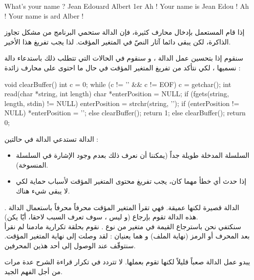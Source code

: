 \begin{Console}
  What's your name ? Jean Edouard Albert 1er
  Ah ! Your name is Jean Edou !
  Ah ! Your name is ard Alber !
\end{Console}

إذا قام المستعمل بإدخال محارف كثيرة، فإن الدالة
ستحمي البرنامج من مشكل تجاوز الذاكرة، لكن يبقى دائما آثار النصّ في المتغير المؤقت. لذا يجب تفريغ هذا الأخير.

سنقوم إذا بتحسين عمل الدالة
،
و سنقوم في الحالات التي تتطلب ذلك باستدعاء دالة نسميها
،
لكي نتأكد من تفريغ المتغير المؤقت في حال ما احتوى على محارف زائدة :

\begin{Csource}
void clearBuffer()
{
 	int c = 0;
 	while (c != '\n' && c != EOF)
 	{
     		c = getchar();
 	}
}
int read(char *string, int length)
{
 	char *enterPosition = NULL;
 	if (fgets(string, length, stdin) != NULL)
 	{
     		enterPosition = strchr(string, '\n');
     		if (enterPosition != NULL)
     		{
         			*enterPosition = '\0';
     		}
     		else
     		{
         			clearBuffer();
     		}
     		return 1;
 	}
 	else
 	{
     		clearBuffer();
     		return 0;
	}
}
\end{Csource}

الدالة
تستدعي الدالة
في حالتين :

\begin{itemize}
  \item السلسلة المدخلة طويلة جداً (يمكننا أن نعرف ذلك بعدم وجود الإشارة
في السلسلة المنسوخة).
  \item إذا حدث أي خطأ مهما كان، يجب تفريغ محتوى المتغير المؤقت لأسباب حماية لكي لا يبقى شيء هناك.
\end{itemize}

الدالة
قصيرة لكنها عميقة. فهي تقرأ المتغير المؤقت محرفاً محرفاً باستعمال الدالة
.
هذه الدالة تقوم بإرجاع
(و ليس
،
سوف تعرف السبب لاحقا، أيّا يكن).\\
سنكتفي نحن باسترجاع القيمة في متغير
من نوع
.
نقوم بحلقة تكرارية مادمنا لم نقرأ بعد المحرف
 أو الرمز
(نهاية الملف) و هما يعنيان : لقد وصلت إلى نهاية المتغير المؤقت. سنتوقّف عند الوصول إلى أحد هذين المحرفين.

يبدو عمل الدالة
صعباً قليلاً لكنها تقوم بعملها. لا تتردد في تكرار قراءة الشرح عدة مرات من أجل الفهم الجيد.

